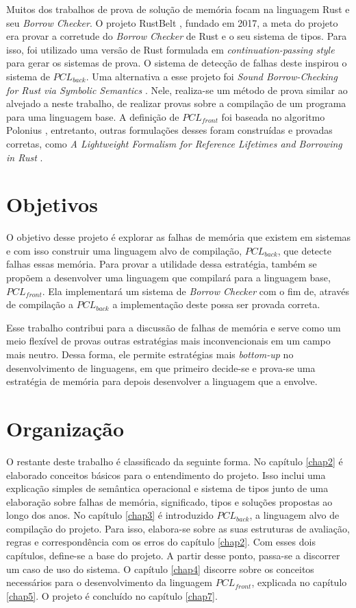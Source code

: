 Muitos dos trabalhos de prova de solução de memória focam na linguagem Rust e seu \emph{Borrow Checker}. O projeto RustBelt \cite{RUSTBELT}, fundado em 2017, a meta do projeto era provar a corretude do \emph{Borrow Checker} de Rust e o seu sistema de tipos. Para isso, foi utilizado uma versão de Rust formulada em \emph{continuation-passing style} para gerar os sistemas de prova. O sistema de detecção de falhas deste inspirou o sistema de $PCL_{back}$. Uma alternativa a esse projeto foi \emph{Sound Borrow-Checking for Rust via Symbolic Semantics} \cite{RUSTSYMBOLIC}. Nele, realiza-se um método de prova similar ao alvejado a neste trabalho, de realizar provas sobre a compilação de um programa para uma linguagem base. A definição de $PCL_{front}$ foi baseada no algoritmo Polonius \cite{Stjerna1684081}, entretanto, outras formulações desses foram construídas e provadas corretas, como \emph{A Lightweight Formalism for Reference Lifetimes and Borrowing in Rust} \cite{RUSTFORMALISM}. 

\section{Objetivos}

O objetivo desse projeto é explorar as falhas de memória que existem em sistemas e com isso construir uma linguagem alvo de compilação, $PCL_{back}$, que detecte falhas essas memória. Para provar a utilidade dessa estratégia, também se propõem a desenvolver uma linguagem que compilará para a linguagem base, $PCL_{front}$. Ela implementará um sistema de \emph{Borrow Checker} com o fim de, através de compilação a $PCL_{back}$ a implementação deste possa ser provada correta.

Esse trabalho contribui para a discussão de falhas de memória e serve como um meio flexível de provas outras estratégias mais inconvencionais em um campo mais neutro. Dessa forma, ele permite estratégias mais \emph{bottom-up} no desenvolvimento de linguagens, em que primeiro decide-se e prova-se uma estratégia de memória para depois desenvolver a linguagem que a envolve.

\section{Organização}

O restante deste trabalho é classificado da seguinte forma. No capítulo \ref{chap2} é elaborado conceitos básicos para o entendimento do projeto. Isso inclui uma explicação simples de semântica operacional e sistema de tipos junto de uma elaboração sobre falhas de memória, significado, tipos e soluções propostas ao longo dos anos. No capítulo \ref{chap3} é introduzido $PCL_{back}$, a linguagem alvo de compilação do projeto. Para isso, elabora-se sobre as suas estruturas de avaliação, regras e correspondência com os erros do capítulo \ref{chap2}. Com esses dois capítulos, define-se a base do projeto. A partir desse ponto, passa-se a discorrer um caso de uso do sistema. O capítulo \ref{chap4} discorre sobre os conceitos necessários para o desenvolvimento da linguagem $PCL_{front}$, explicada no capítulo \ref{chap5}. O projeto é concluído no capítulo \ref{chap7}.
